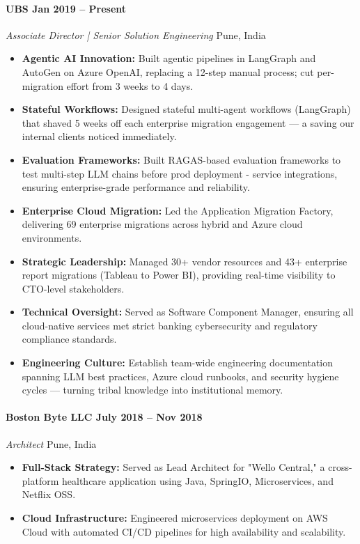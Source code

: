 \documentclass[10pt, letterpaper]{article}
\begin{document}
\paragraph{\textbf{UBS} \hfill Jan 2019 -- Present \\}
\textit{Associate Director | Senior Solution Engineering} \hfill Pune, India
\begin{itemize}[noitemsep, topsep=0pt]
    \item \textbf{Agentic AI Innovation:} Built agentic pipelines in LangGraph and AutoGen on Azure OpenAI, replacing a 12-step manual process; cut per-migration effort from 3 weeks to 4 days.
    \item \textbf{Stateful Workflows:} Designed stateful multi-agent workflows (LangGraph) that shaved 5 weeks off each enterprise migration engagement — a saving our internal clients noticed immediately.
    \item \textbf{Evaluation Frameworks:} Built RAGAS-based evaluation frameworks to test multi-step LLM chains before prod deployment - service integrations, ensuring enterprise-grade performance and reliability.
    \item \textbf{Enterprise Cloud Migration:} Led the Application Migration Factory, delivering 69 enterprise migrations across hybrid and Azure cloud environments.
    \item \textbf{Strategic Leadership:} Managed 30+ vendor resources and 43+ enterprise report migrations (Tableau to Power BI), providing real-time visibility to CTO-level stakeholders.
    \item \textbf{Technical Oversight:} Served as Software Component Manager, ensuring all cloud-native services met strict banking cybersecurity and regulatory compliance standards.
    \item \textbf{Engineering Culture:} Establish team-wide engineering documentation spanning LLM best practices, Azure cloud runbooks, and security hygiene cycles — turning tribal knowledge into institutional memory.
\end{itemize}

\paragraph{\textbf{Boston Byte LLC} \hfill July 2018 -- Nov 2018 \\}
\textit{Architect} \hfill Pune, India
\begin{itemize}[noitemsep, topsep=0pt]
    \item \textbf{Full-Stack Strategy:} Served as Lead Architect for "Wello Central," a cross-platform healthcare application using Java, SpringIO, Microservices, and Netflix OSS.
    \item \textbf{Cloud Infrastructure:} Engineered microservices deployment on AWS Cloud with automated CI/CD pipelines for high availability and scalability.
\end{itemize}
\end{document}
